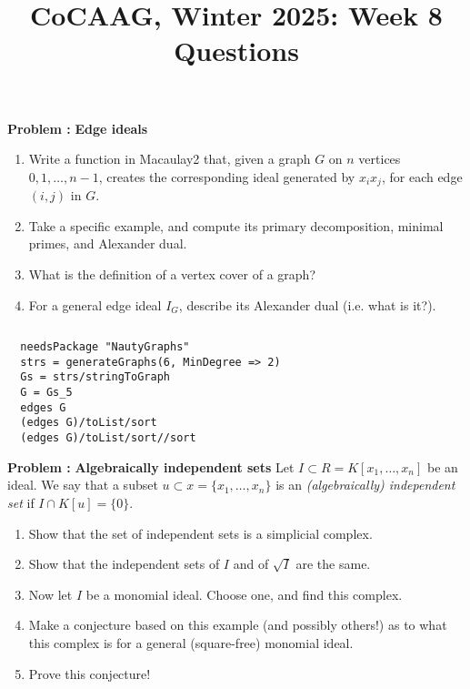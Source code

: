 \documentclass[11pt]{amsart}
\numberwithin{equation}{section}
\newcommand{\bnum}{\begin{enumerate}} %
\newcommand{\babc}{\bnum\renewcommand{\labelenumi}{(\alph{enumi})}}%
\newcommand{\eabc}{\end{enumerate}}
\theoremstyle{definition}
\theoremstyle{remark}
\newcounter{excount}
\newcommand\exercise[1]{\addtocounter{excount}{1}\noindent\textbf{Problem \arabic{excount}: }#1{$ $}\\}
\begin{document}
\setcounter{excount}{0}

\title{CoCAAG, Winter 2025: Week 8 Questions}
\maketitle
\vspace{0.5cm}

\bigskip

\exercise{{\bf Edge ideals}
  \babc
\item Write a function in Macaulay2 that, given a graph $G$ on $n$ vertices $0, 1, \ldots, n-1$, creates the
  corresponding ideal generated by $x_i x_j$, for each edge $(i,j)$ in $G$.
\item Take a specific example, and compute its primary decomposition, minimal primes, and Alexander dual.
  \item What is the definition of a vertex cover of a graph?
\item For a general edge ideal $I_G$, describe its Alexander dual (i.e. what is it?).
  \eabc
}    
{\tiny\begin{verbatim}
  needsPackage "NautyGraphs"
  strs = generateGraphs(6, MinDegree => 2)
  Gs = strs/stringToGraph
  G = Gs_5
  edges G
  (edges G)/toList/sort
  (edges G)/toList/sort//sort
\end{verbatim}
}

\bigskip

\exercise{{\bf Algebraically independent sets}
  Let $I \subset R = K[x_1, \ldots, x_n]$ be an ideal.
  We say that a subset $u \subset x = \{x_1, \ldots, x_n\}$ is
  an {\it (algebraically) independent set} if $I \cap K[u] = \{0\}$.
  \babc
\item Show that the set of independent sets is a simplicial complex.
\item Show that the independent sets
  of $I$ and of $\sqrt{I}$ are the same.
\item Now let $I$ be a monomial ideal.  Choose one, and find this complex.
\item Make a conjecture based on this example (and possibly others!) as to what this complex is
  for a general (square-free) monomial ideal.
  \item Prove this conjecture!
  \eabc
}


\medskip
 
\end{document}
